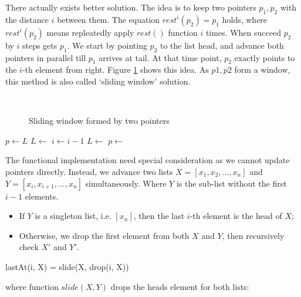 \documentclass[b5paper]{article}
\begin{document}
There actually exists better solution. The idea is to keep two pointers $p_1, p_2$ with the distance $i$ between them. The equation $rest^i(p_2) = p_1$ holds, where $rest^i(p_2)$ means repleatedly apply $rest()$ function $i$ times. When succeed $p_2$ by $i$ steps gets $p_1$. We start by pointing $p_2$ to the list head, and advance both pointers in parallel till $p_1$ arrives at tail. At that time point, $p_2$ exactly points to the $i$-th element from right. Figure \ref{fig:list-rindex} shows this idea. As $p1, p2$ form a window, this method is also called `sliding window' solution.

\begin{figure}[htbp]
  \centering
   \\
  \caption{Sliding window formed by two pointers} \label{fig:list-rindex}
\end{figure}

\begin{algorithmic}[1]
  \State $p \gets L$
    \State $L \gets $  
    \State $i \gets i - 1$
  \EndWhile
    \State $L \gets$ 
    \State $p \gets$ 
  \EndWhile
  \State \Return {}
\EndFunction
\end{algorithmic}

The functional implementation need special consideration as we cannot update pointers directly. Instead, we advance two lists $X = [x_1, x_2, ..., x_n]$ and $Y = [x_i, x_{i+1}, ..., x_n]$ simultaneously. Where $Y$ is the sub-list without the first $i - 1$ elements.

\begin{itemize}
\item If $Y$ is a singleton list, i.e. $[x_n]$, then the last $i$-th element is the head of $X$;
\item Otherwise, we drop the first element from both $X$ and $Y$, then recursively check $X'$ and $Y'$.
\end{itemize}

\be
lastAt(i, X) = slide(X, drop(i, X))
\ee

where function $slide(X, Y)$ drops the heads element for both lists:
\end{document}
